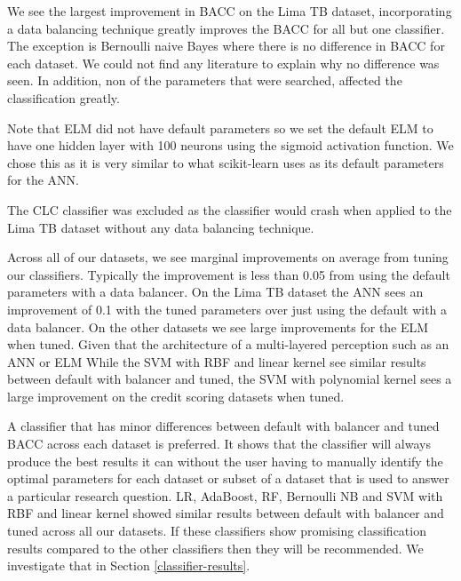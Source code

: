 \documentclass{sig-alternate-05-2015}
\begin{document}
	We see the largest improvement in BACC on the Lima TB dataset, incorporating a data balancing technique greatly improves the BACC for all but one classifier. The exception is Bernoulli naive Bayes where there is no difference in BACC for each dataset. We could not find any literature to explain why no difference was seen. In addition, non of the parameters that were searched, affected the classification greatly.
	
	Note that ELM did not have default parameters so we set the default ELM to have one hidden layer with 100 neurons using the sigmoid activation function. We chose this as it is very similar to what scikit-learn \cite{scikit-learn} uses as its default parameters for the ANN.
	
	The CLC classifier was excluded as the classifier would crash when applied to the Lima TB dataset without any data balancing technique.
	
	Across all of our datasets, we see marginal improvements on average from tuning our classifiers. Typically the improvement is less than 0.05 from using the default parameters with a data balancer. On the Lima TB dataset the ANN sees an improvement of 0.1 with the tuned parameters over just using the default with a data balancer. On the other datasets we see large improvements for the ELM when tuned. Given that the architecture of a multi-layered perception such as an ANN or ELM  While the SVM with RBF and linear kernel see similar results between default with balancer and tuned, the SVM with polynomial kernel sees a large improvement on the credit scoring datasets when tuned.
	
	A classifier that has minor differences between default with balancer and tuned BACC across each dataset is preferred. It shows that the classifier will always produce the best results it can without the user having to manually identify the optimal parameters for each dataset or subset of a dataset that is used to answer a particular research question. LR, AdaBoost, RF, Bernoulli NB and SVM with RBF and linear kernel showed similar results between default with balancer and tuned across all our datasets. If these classifiers show promising classification results compared to the other classifiers then they will be recommended. We investigate that in Section \ref{classifier-results}.
\end{document}
